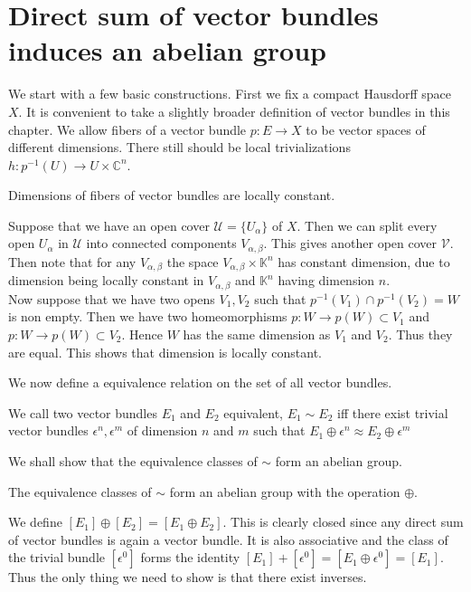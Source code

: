 \documentclass[../Thesis.tex]{subfiles}
\begin{document}
\section{Direct sum of vector bundles induces an abelian group}
We start with a few basic constructions. First we fix a compact Hausdorff space $X$. It is convenient to take a slightly broader definition of vector bundles in this chapter. We allow fibers of a vector bundle $p : E \rightarrow X$ to be vector spaces of different dimensions. There still should be local trivializations $h: p^{-1}(U) \rightarrow U \times \mathbb{C}^n$. 
\begin{lemma}
Dimensions of fibers of vector bundles are locally constant.
\end{lemma}
\begin{myproof}
Suppose that we have an open cover $\mathcal{U} = \{U_\alpha\}$ of $X$. Then we can split every open $U_\alpha$ in $\mathcal{U}$ into connected components $V_{\alpha, \beta}$. This gives another open cover $\mathcal{V}$.
\\Then note that for any $V_{\alpha, \beta}$ the space $V_{\alpha, \beta} \times \mathbb{K}^n$ has constant dimension, due to dimension being locally constant in $V_{\alpha, \beta}$ and $\mathbb{K}^n$ having dimension $n$.
\\Now suppose that we have two opens $V_1,V_2$ such that $p^{-1}(V_1) \cap p^{-1} (V_2) = W$ is non empty. Then we have two homeomorphisms $p : W \rightarrow p(W) \subset V_1$ and $p : W \rightarrow p(W) \subset V_2$. Hence $W$ has the same dimension as $V_1$ and $V_2$. Thus they are equal. This shows that dimension is locally constant.
\end{myproof}
We now define a equivalence relation on the set of all vector bundles. 
\begin{mydef}
We call two vector bundles $E_1$ and $E_2$ equivalent, $E_1 \sim E_2$ iff there exist trivial vector bundles $\epsilon^n, \epsilon^m$ of dimension $n$ and $m$ such that $E_1 \oplus \epsilon^n \approx E_2 \oplus \epsilon^m$
\end{mydef}
We shall show that the equivalence classes of $\sim$ form an abelian group.
\begin{theorem}
The equivalence classes of $\sim$ form an abelian group with the operation $\oplus$.
\end{theorem}
We define $[E_1] \oplus [E_2] = [E_1 \oplus E_2]$. This is clearly closed since any direct sum of vector bundles is again a vector bundle. It is also associative and the class of the trivial bundle $[\epsilon^0]$ forms the identity $[E_1] + [\epsilon^0] = [E_1 \oplus \epsilon^0] = [E_1]$. Thus the only thing we need to show is that there exist inverses.
\end{document}
